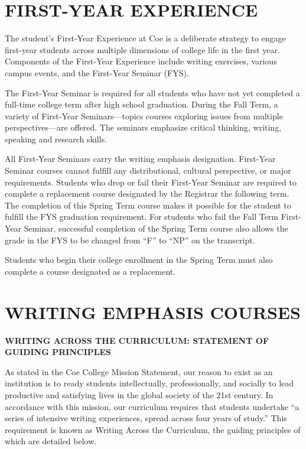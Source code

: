 \documentclass[
  letterpaper,
]{scrbook}
\begin{document}
\chapter{FIRST-YEAR EXPERIENCE}\label{sec-first-year-experience}

The student's First-Year Experience at Coe is a deliberate strategy to
engage first-year students across multiple dimensions of college life in
the first year. Components of the First-Year Experience include writing
exercises, various campus events, and the First-Year Seminar (FYS).

The First-Year Seminar is required for all students who have not yet
completed a full-time college term after high school graduation. During
the Fall Term, a variety of First-Year Seminars---topics courses
exploring issues from multiple perspectives---are offered. The seminars
emphasize critical thinking, writing, speaking and research skills.

All First-Year Seminars carry the writing emphasis designation.
First-Year Seminar courses cannot fulfill any distributional, cultural
perspective, or major requirements. Students who drop or fail their
First-Year Seminar are required to complete a replacement course
designated by the Registrar the following term. The completion of this
Spring Term course makes it possible for the student to fulfill the FYS
graduation requirement. For students who fail the Fall Term First-Year
Seminar, successful completion of the Spring Term course also allows the
grade in the FYS to be changed from ``F'' to ``NP'' on the transcript.

Students who begin their college enrollment in the Spring Term must also
complete a course designated as a replacement.

\chapter{WRITING EMPHASIS COURSES}\label{sec-writing-emphasis-courses}

\textbf{WRITING ACROSS THE CURRICULUM: STATEMENT OF GUIDING PRINCIPLES}

As stated in the Coe College Mission Statement, our reason to exist as
an institution is to ready students intellectually, professionally, and
socially to lead productive and satisfying lives in the global society
of the 21st century. In accordance with this mission, our curriculum
requires that students undertake ``a series of intensive writing
experiences, spread across four years of study.'' This requirement is
known as Writing Across the Curriculum, the guiding principles of which
are detailed below.
\end{document}
